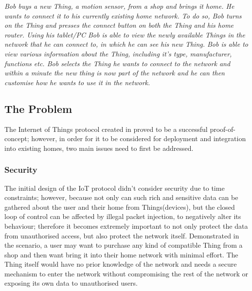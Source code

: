 \documentclass{mprop}
\begin{document}
\textit{Bob buys a new Thing, a motion sensor, from a shop and brings it home. He wants to connect it to his currently existing home network. To do so, Bob turns on the Thing and presses the connect button on both the Thing and his home router. Using his tablet/PC Bob is able to view the newly available Things in the network that he can connect to, in which he can see his new Thing. Bob is able to view various information about the Thing, including it's type, manufacturer, functions etc. Bob selects the Thing he wants to connect to the network and within a minute the new thing is now part of the network and he can then customise how he wants to use it in the network.}

\subsection{The Problem} %
\label{sub:the_problem}
The Internet of Things protocol created in \cite{KNoT} proved to be a successful proof-of-concept; however, in order for it to be considered for deployment and integration into existing homes, two main issues need to first be addressed.

\subsubsection{Security} %
\label{ssub:security}

The initial design of the IoT protocol didn't consider security due to time constraints; however, because not only can such rich and sensitive data can be gathered about the user and their home from Things(devices), but the closed loop of control can be affected by illegal packet injection, to negatively alter its behaviour; therefore it becomes extremely important to not only protect the data from unauthorised access, but also protect the network itself. Demonstrated in the scenario, a user may want to purchase any kind of compatible Thing from a shop and then want bring it into their home network with minimal effort. The Thing itself would have no prior knowledge of the network and needs a secure mechanism to enter the network without compromising the rest of the network or exposing its own data to unauthorised users. 
\end{document}
